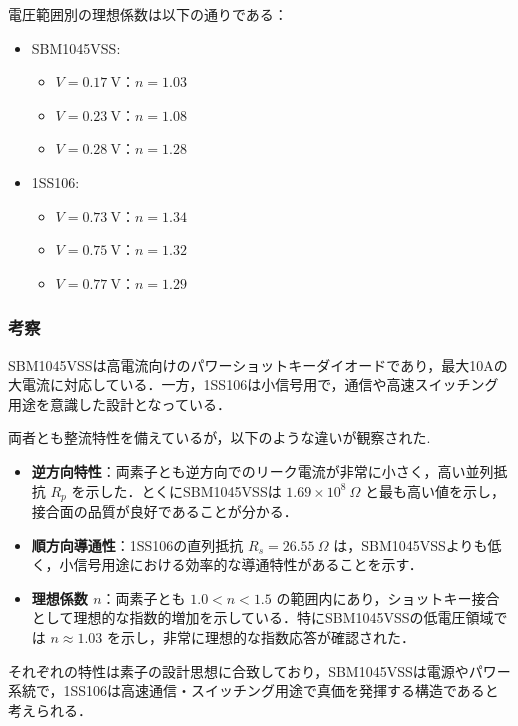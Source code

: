 電圧範囲別の理想係数は以下の通りである：

\begin{itemize}
    \item SBM1045VSS:
    \begin{itemize}
        \item \( V = 0.17~\mathrm{V} \)：\( n = 1.03 \)
        \item \( V = 0.23~\mathrm{V} \)：\( n = 1.08 \)
        \item \( V = 0.28~\mathrm{V} \)：\( n = 1.28 \)
    \end{itemize}
    \item 1SS106:
    \begin{itemize}
        \item \( V = 0.73~\mathrm{V} \)：\( n = 1.34 \)
        \item \( V = 0.75~\mathrm{V} \)：\( n = 1.32 \)
        \item \( V = 0.77~\mathrm{V} \)：\( n = 1.29 \)
    \end{itemize}
\end{itemize}

\vspace{1em}
\subsubsection*{考察}

SBM1045VSSは高電流向けのパワーショットキーダイオードであり，最大10Aの大電流に対応している．一方，1SS106は小信号用で，通信や高速スイッチング用途を意識した設計となっている．

両者とも整流特性を備えているが，以下のような違いが観察された.

\begin{itemize}
    \item \textbf{逆方向特性}：両素子とも逆方向でのリーク電流が非常に小さく，高い並列抵抗 \( R_p \) を示した．とくにSBM1045VSSは \( 1.69 \times 10^8~\Omega \) と最も高い値を示し，接合面の品質が良好であることが分かる．

    \item \textbf{順方向導通性}：1SS106の直列抵抗 \( R_s = 26.55~\Omega \) は，SBM1045VSSよりも低く，小信号用途における効率的な導通特性があることを示す．

    \item \textbf{理想係数 \( n \)}：両素子とも \( 1.0 < n < 1.5 \) の範囲内にあり，ショットキー接合として理想的な指数的増加を示している．特にSBM1045VSSの低電圧領域では \( n \approx 1.03 \) を示し，非常に理想的な指数応答が確認された．
\end{itemize}

それぞれの特性は素子の設計思想に合致しており，SBM1045VSSは電源やパワー系統で，1SS106は高速通信・スイッチング用途で真価を発揮する構造であると考えられる．
